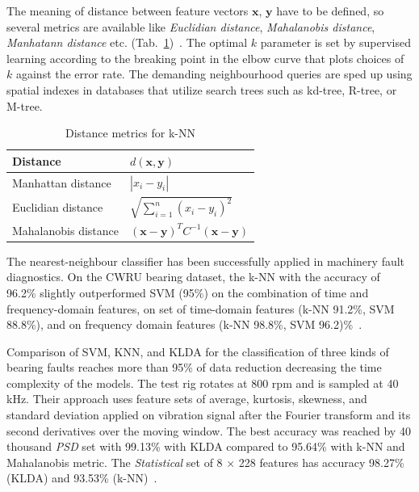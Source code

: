 The meaning of distance between feature vectors $\mathbf{x}$, $\mathbf{y}$ have to be defined, so several metrics are available like \emph{Euclidian distance}, \emph{Mahalanobis distance}, \emph{Manhatann distance} etc. (Tab.~\ref{tab:KNN-distance})~\cite{sheng_review_2020, abu_alfeilat_effects_2019}. The optimal $k$ parameter is set by supervised learning according to the breaking point in the elbow curve that plots choices of $k$ against the error rate. The demanding neighbourhood queries are sped up using spatial indexes in databases that utilize search trees such as kd-tree, R-tree, or M-tree.

\begin{table}[ht]
\centering
\renewcommand{\arraystretch}{2}
\begin{tabular}{|l|l|}
\hline
\textbf{Distance}     & \textbf{$d(\mathbf{x}, \mathbf{y})$}                                   \\ \hline
Manhattan distance	 & $ |x_i - y_i| $													   \\ \hline
Euclidian distance    & $ \sqrt{\sum_{i = 1}^{n}(x_i - y_i)^2} $                               \\ \hline
Mahalanobis distance  & $ (\mathbf{x} - \mathbf{y})^T C^{-1} (\mathbf{x} - \mathbf{y}) $       \\ \hline
\end{tabular}
\caption{Distance metrics for k-NN}
\label{tab:KNN-distance}
\end{table}

The nearest-neighbour classifier has been successfully applied in machinery fault diagnostics. On the CWRU bearing dataset, the k-NN with the accuracy of 96.2\% slightly outperformed SVM (95\%) on the combination of time and frequency-domain features, on set of time-domain features (k-NN 91.2\%, SVM 88.8\%), and on frequency domain features (k-NN 98.8\%, SVM 96.2)\%~\cite{jamil_feature-based_2021}.

Comparison of SVM, KNN, and KLDA for the classification of three kinds of bearing faults reaches more than 95\% of data reduction decreasing the time complexity of the models. The test rig rotates at 800 rpm and is sampled at 40 kHz. Their approach uses feature sets of average, kurtosis, skewness, and standard deviation applied on vibration signal after the Fourier transform and its second derivatives over the moving window. The best accuracy was reached by 40 thousand \emph{PSD} set with 99.13\% with KLDA compared to 95.64\% with k-NN and Mahalanobis metric. The \emph{Statistical} set of 8 $\times$ 228 features has accuracy 98.27\% (KLDA) and 93.53\% (k-NN)~\cite{altaf_new_2022}.

